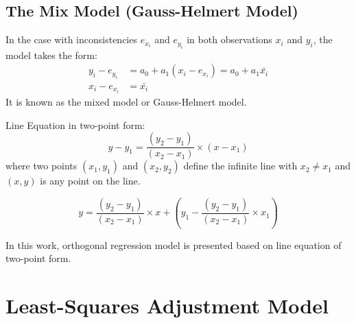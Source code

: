 \subsection{The Mix Model (Gauss-Helmert Model)}
\label{subsec:2.3.2}

In the case with inconsistencies $e_{x_i}$ and $e_{y_i}$ in both observations $x_i$ and $y_i$, the model takes the form:
\begin{equation} %
\begin{split}
y_i - e_{y_i} &= a_0 + a_1(x_i-e_{x_i}) = a_0 + a_1\bar{x_i}\\
x_i-e_{x_i} &= \bar{x_i}
\end{split}
\end{equation}
It is known as the mixed model or Gauss-Helmert model.

Line Equation in two-point form:
\begin{equation} %
y-y_1 = \dfrac{(y_2-y_1)}{(x_2-x_1)}\times(x-x_1)
\end{equation}
where two points $(x_1,y_1)$ and $(x_2,y_2)$ define the infinite line with $x_2\neq x_1$ and $(x,y)$ is any point on the line.





\begin{equation} %
y = \dfrac{(y_2-y_1)}{(x_2-x_1)}\times x+(y_1-\dfrac{(y_2-y_1)}{(x_2-x_1)}\times x_1)
\end{equation}



In this work, orthogonal regression model is presented based on line equation of two-point form.





\section{Least-Squares Adjustment Model}
\label{sec:2.4}







